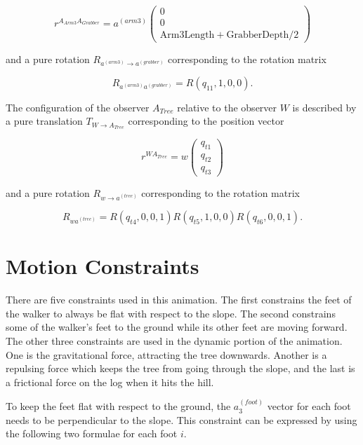\documentclass{article}
\begin{document}
\begin{equation*}
r^{A_{Arm3}A_{Grabber}}=a^{(arm3)}\left(\begin{array}{c}
0 \\ 0 \\ \text{Arm3Length} + \text{GrabberDepth}/2 \end{array}\right)
\end{equation*}

and a pure rotation $R_{a^{(arm3)} \rightarrow a^{(grabber)}}$ corresponding to the rotation matrix

\begin{equation*}
R_{a^{(arm3)}a^{(grabber)}}=R(q_{11},1,0,0)\text{.}
\end{equation*}%

The configuration of the observer $A_{Tree}$ relative to the observer $W$ is described by a pure translation $T_{W \rightarrow A_{Tree}}$ corresponding to the position vector

\begin{equation*}
r^{WA_{Tree}}=w\left(\begin{array}{c}
q_{t1} \\ q_{t2} \\ q_{t3} \end{array}\right)
\end{equation*}

and a pure rotation $R_{w \rightarrow a^{(tree)}}$ corresponding to the rotation matrix

\begin{equation*}
R_{wa^{(tree)}}=R(q_{t4},0,0,1)R(q_{t5},1,0,0)R(q_{t6},0,0,1)\text{.}
\end{equation*}%

\section{Motion Constraints} %
There are five constraints used in this animation. The first constrains the feet of the walker to always be flat with respect to the slope. The second constrains some of the walker's feet to the ground while its other feet are moving forward. The other three constraints are used in the dynamic portion of the animation. One is the gravitational force, attracting the tree downwards. Another is a repulsing force which keeps the tree from going through the slope, and the last is a frictional force on the log when it hits the hill.

To keep the feet flat with respect to the ground, the $a_3^{(foot)}$ vector for each foot needs to be perpendicular to the slope. This constraint can be expressed by using the following two formulae for each foot $i$.
\end{document}
